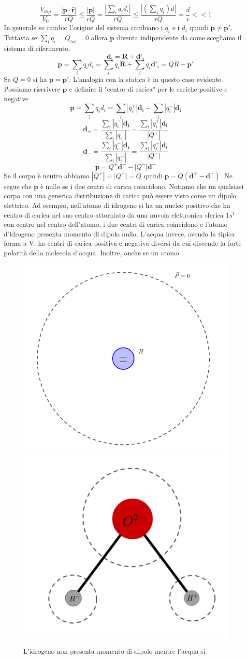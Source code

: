 \documentclass[
10pt, %
a4paper, %
oneside, %
headinclude,footinclude, %
BCOR5mm, %
]{scrartcl}
\begin{document}
 \[\frac{V_{dip}}{V_0} = \frac{|\mathbf{p}\cdot \hat{\mathbf{r}}|}{rQ}\leq\frac{|\mathbf{p}|}{rQ} = \frac{|\sum_i q_i d_i|}{rQ}\leq \frac{|(\sum_i q_i)d|}{rQ} = \frac{d}{r}<<1\]
 In generale se cambio l'origine del sistema cambiano i \(q_i\) e i \(d_i\) quindi \(\mathbf{p}\neq\mathbf{p}'\). Tuttavia se \(\sum_i q_i = Q_{tot} = 0\) allora $\mathbf{p}$ diventa indipendente da come scegliamo il sistema di riferimento. 
\[\mathbf{d}_i = \mathbf{R}+\mathbf{d}'_i\]
\[\mathbf{p} = \sum_iq_id_i = \sum_iq_i\mathbf{R}+\sum_iq_i\mathbf{d}'_i=QR+\mathbf{p}'\]
Se \(Q = 0\) si ha \(\mathbf{p} = \mathbf{p}'\). L'analogia con la statica è in questo caso evidente.\\
Possiamo riscrivere $\mathbf{p}$ e definire il "centro di carica" per le cariche positive e negative 
\[\mathbf{p} = \sum_iq_id_i = \sum_i|q_i^+|\mathbf{d_i}-\sum_i|q_i^-|\mathbf{d_i}\]
\[\mathbf{d}_+ = \frac{\sum_i|q_i^+|\mathbf{d_i}}{\sum_i|q_i^+|} = \frac{\sum_i|q_i^+|\mathbf{d_i}}{|Q^+|}\]
\[\mathbf{d}_- = \frac{\sum_i|q_i^-|\mathbf{d_i}}{\sum_i|q_i^-|} = \frac{\sum_i|q_i^-|\mathbf{d_i}}{|Q^-|}\]
\[\mathbf{p} = Q^+\mathbf{d}^+-|Q^-|\mathbf{d}^-\]
Se il corpo è neutro abbiamo \(|Q^+|=|Q^-|=Q\) quindi \(\mathbf{p} = Q(\mathbf{d}^+-\mathbf{d}^-)\). Ne segue che $\mathbf{p}$ è nullo se i due centri di carica coincidono. Notiamo che un qualsiasi corpo con una generica distribuzione di carica può essere visto come un dipolo elettrico. Ad esempio, nell'atomo di idrogeno si ha un nucleo positivo che ha centro di carica nel suo centro attorniato da una nuvola elettronica sferica \(1s^1\) con centro nel centro dell'atomo, i due centri di carica coincidono e l'atomo d'idrogeno presenta momento di dipolo nullo. L'acqua invece, avendo la tipica forma a V, ha centri di carica positiva e negativa diversi da cui discende la forte polarità della molecola d'acqua. Inoltre, anche se un atomo 
\begin{figure}[h!]
	\centering
	\includegraphics[width=0.4\linewidth]{../images/dielettrico_idrogeno_1}\quad
	\includegraphics[width=0.5\linewidth]{../images/dipolo_H_H2O}
	\caption{L'idrogeno non presenta momento di dipolo mentre l'acqua si.}
	\label{fig:dipolohh2o}
\end{figure}
\FloatBarrier
\end{document}
